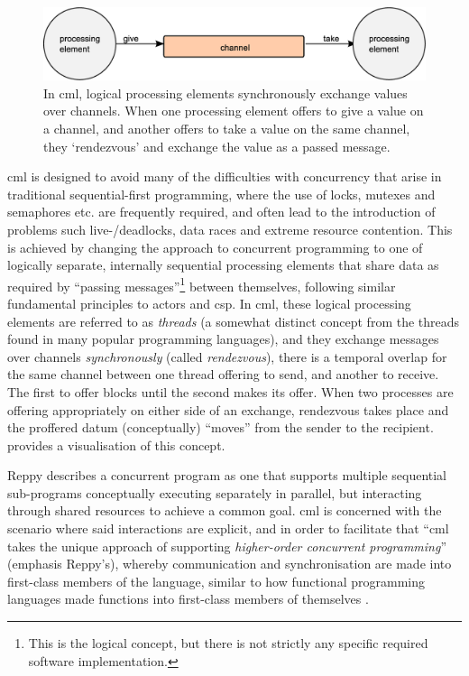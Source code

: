 \begin{figure}
    \centering
    \includegraphics[width=\textwidth]{chapters/background/images/cml_exchange.eps}
    \caption[Diagram of the message-passing primitive in ]{In \gls{cml}, logical processing elements synchronously exchange values over channels.  When one processing element offers to give a value on a channel, and another offers to take a value on the same channel, they ‘rendezvous’ and exchange the value as a passed message.}
    \label{fig:back:cml_exchange}
\end{figure}

\Gls{cml} is designed to avoid many of the difficulties with concurrency that arise in traditional sequential-first programming, where the use of locks, mutexes and semaphores etc. are frequently required, and often lead to the introduction of problems such live-/deadlocks, data races and extreme resource contention.  This is achieved by changing the approach to concurrent programming to one of logically separate, internally sequential processing elements that share data as required by ``passing messages''\footnote{This is the logical concept, but there is not strictly any specific required software implementation.} between themselves, following similar fundamental principles to \glspl{actor} and \gls{csp}.  In \gls{cml}, these logical processing elements are referred to as \emph{threads} (a somewhat distinct concept from the threads found in many popular programming languages), and they exchange messages over channels \emph{synchronously} (called \emph{rendezvous}), \ie{} there is a temporal overlap for the same channel between one thread offering to send, and another to receive.  The first to offer blocks until the second makes its offer.  When two processes are offering appropriately on either side of an exchange, rendezvous takes place and the proffered datum (conceptually) ``moves'' from the sender to the recipient.   provides a visualisation of this concept.

Reppy describes a concurrent program as one that supports multiple sequential sub-programs conceptually executing separately in parallel, but interacting through shared resources to achieve a common goal.  \Gls{cml} is concerned with the scenario where said interactions are explicit, and in order to facilitate that \enquote{\gls{cml} takes the unique approach of supporting \emph{higher-order concurrent programming}} (emphasis Reppy's), whereby communication and synchronisation are made into first-class members of the language, similar to how functional programming languages made functions into first-class members of themselves \cite[Preface]{Reppy2007}.